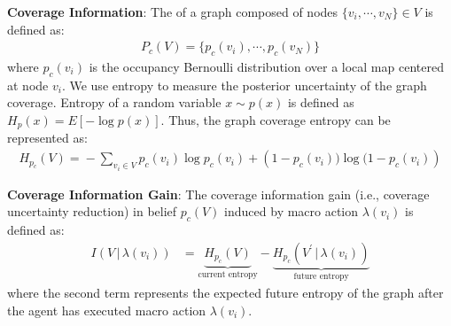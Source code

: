 \documentclass[letterpaper, 10pt, conference]{ieeeconf}      %
\newcommand{\ph}[1]{{\textbf{#1}:}} %
\newcommand{\rev}[1]{{\color{blue}#1}} %
\begin{document}


\ph{Coverage Information} The  of a graph composed of nodes $\{v_i, \cdots ,v_N\} \in V$ is defined as: 
\begin{align}
    \nonumber
    P_c(V) = \{p_c(v_i), \cdots , p_c(v_N)\}
\end{align}
where $p_c(v_i)$ is the occupancy Bernoulli distribution over a local map centered at node $v_i$. We use entropy to measure the posterior uncertainty of the graph coverage. Entropy of a random variable $x\sim p(x)$ is defined as $H_p(x) = E[-\log p(x)]$. Thus, the graph coverage entropy can be represented as:
\begin{align}
    \nonumber
    H_{p_{c}}\!(V) \!=\! -\!\!\!\sum_{v_i \in V}\!\!
    p_{c}(v_i) \log p_{c}(v_i) 
    \!+\!
    \left(1-p_{c}(v_i)) \! \log (1-p_{c}(v_i)\right)
\end{align}

\ph{Coverage Information Gain}
The coverage information gain (i.e., coverage uncertainty reduction) in belief $p_{c}(V)$ induced by macro action $\lambda(v_i)$ is defined as:
\begin{align}
    I(V \, | \, \lambda(v_i)) &= \underbrace{H_{p_{c}}(V)}_\text{current entropy} - \underbrace{H_{p_{c}}(V^\prime \, | \, \lambda(v_i))}_\text{future entropy}
\end{align}
where the second term represents the expected future entropy of the graph after the agent has executed macro action $\lambda(v_i)$. 

\end{document}
